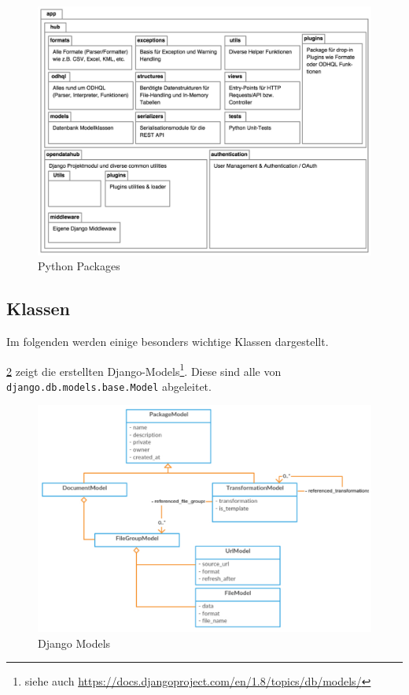 \begin{figure}[H]
    \centering
    \includegraphics[width=\linewidth]{fig/packages}
    \caption{Python Packages}
    \label{fig:pd:pypackages}
\end{figure}

\subsection{Klassen}
Im folgenden werden einige besonders wichtige Klassen dargestellt.

\cref{fig:pd:modelclasses} zeigt die erstellten Django-Models\footnote{siehe auch \url{https://docs.djangoproject.com/en/1.8/topics/db/models/}}. Diese sind alle von \texttt{django.db.models.base.Model} abgeleitet.
\begin{figure}[H]
    \centering
    \includegraphics[width=\linewidth]{fig/model-classes}
    \caption{Django Models}
    \label{fig:pd:modelclasses}
\end{figure}
